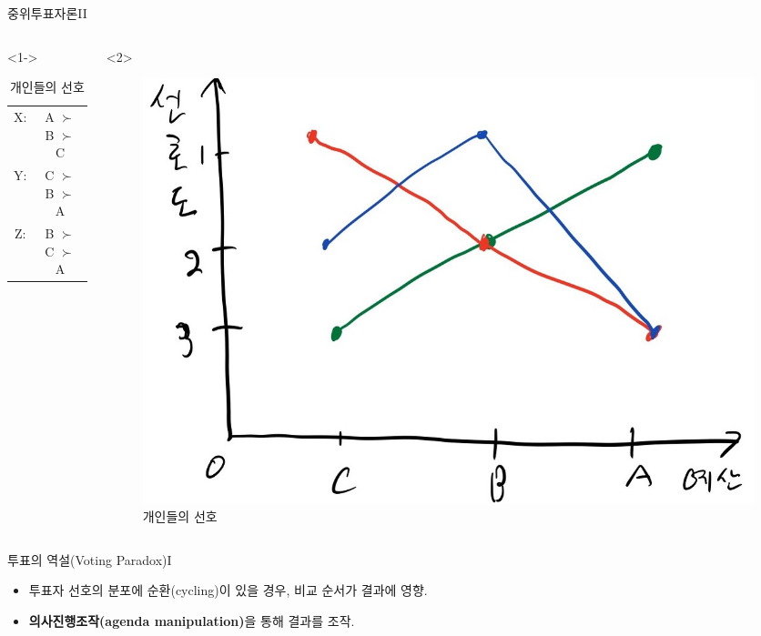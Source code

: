 \documentclass[aspectratio=169,xcolor=dvipsnames,handout]{beamer}
\begin{document}
\begin{frame}{중위투표자론II}
    \begin{columns}
        \begin{column}{.5\textwidth}<1->
            \begin{table}[]
                \begin{tabular}{cc}
                     X: & A $\succ$ B $\succ$ C \\
                     Y: & C $\succ$ B $\succ$ A \\
                     Z: & B $\succ$ C $\succ$ A
                \end{tabular}
                \caption{개인들의 선호}
            \end{table}
        \end{column}
        \begin{column}{.5\textwidth}<2>
            \begin{figure}
                \centering
                \includegraphics[width=.8\textwidth]{pic/voting1.jpg}
                \caption{개인들의 선호}
            \end{figure}
        \end{column}
    \end{columns}
\end{frame}

\begin{frame}{투표의 역설(Voting Paradox)I}
    \begin{itemize}[<+->]
        \item 투표자 선호의 분포에 순환(cycling)이 있을 경우, 비교 순서가 결과에 영향.
        \item {\bf 의사진행조작(agenda manipulation)}을 통해 결과를 조작.
    \end{itemize}
\end{frame}
\end{document}
